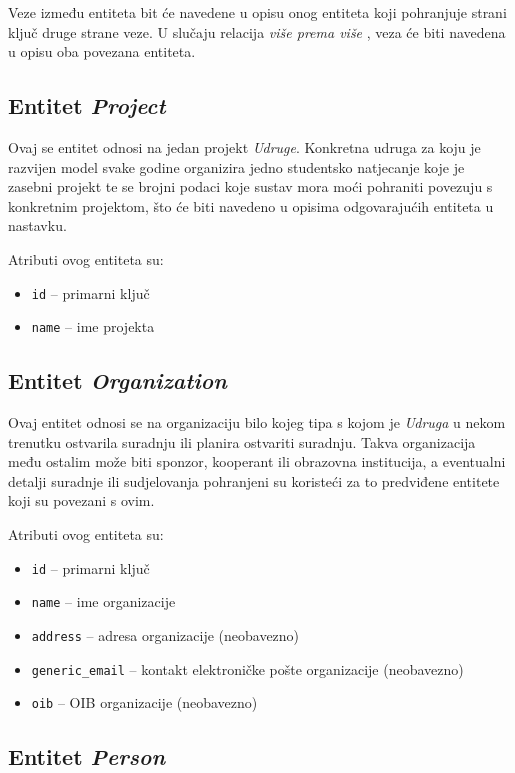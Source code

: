 \documentclass[times, utf8, diplomski]{fer}
\begin{document}
Veze između entiteta bit će navedene u opisu onog entiteta koji pohranjuje
strani ključ druge strane veze. U slučaju relacija \emph{više prema više}
, veza će biti navedena u opisu oba povezana entiteta.

\subsection{Entitet \emph{Project}} \label{project}

Ovaj se entitet odnosi na jedan projekt \emph{Udruge}. Konkretna udruga za koju
je razvijen model svake godine organizira jedno studentsko natjecanje koje je
zasebni projekt te se brojni podaci koje sustav mora moći pohraniti povezuju s
konkretnim projektom, što će biti navedeno u opisima odgovarajućih entiteta u
nastavku.

\medskip
Atributi ovog entiteta su:
\begin{itemize}
    \item \texttt{id} -- primarni ključ
    \item \texttt{name} -- ime projekta
\end{itemize}

\subsection{Entitet \emph{Organization}} \label{organization}

Ovaj entitet odnosi se na organizaciju bilo kojeg tipa s kojom je \emph{Udruga} u nekom
trenutku ostvarila suradnju ili planira ostvariti suradnju. Takva organizacija
među ostalim može biti sponzor, kooperant ili obrazovna institucija, a
eventualni detalji suradnje ili sudjelovanja pohranjeni su koristeći za to
predviđene entitete koji su povezani s ovim.

\medskip
Atributi ovog entiteta su:
\begin{itemize}
    \item \texttt{id} -- primarni ključ
    \item \texttt{name} -- ime organizacije
    \item \texttt{address} -- adresa organizacije (neobavezno)
    \item \texttt{generic\_email} -- kontakt elektroničke pošte organizacije
        (neobavezno)
    \item \texttt{oib} -- OIB organizacije (neobavezno)
\end{itemize}

\subsection{Entitet \emph{Person}} \label{person}
\end{document}

